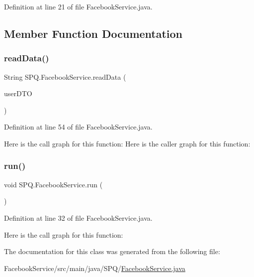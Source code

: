 Definition at line 21 of file Facebook\+Service.\+java.



\subsection{Member Function Documentation}
\mbox{\label{class_s_p_q_1_1_facebook_service_a087e3aab2d870149c0ef74f3adf75efa}} 
\subsubsection{\texorpdfstring{read\+Data()}{readData()}}
{\footnotesize\ttfamily String S\+P\+Q.\+Facebook\+Service.\+read\+Data (\begin{DoxyParamCaption}\item[{\mbox{\hyperlink{class_s_p_q_1_1dto_1_1_user_d_t_o}{User\+D\+TO}}}]{user\+D\+TO }\end{DoxyParamCaption})}



Definition at line 54 of file Facebook\+Service.\+java.

Here is the call graph for this function\+:
Here is the caller graph for this function\+:
\mbox{\label{class_s_p_q_1_1_facebook_service_a24a62bc6a32966419548314bc417abfb}} 
\subsubsection{\texorpdfstring{run()}{run()}}
{\footnotesize\ttfamily void S\+P\+Q.\+Facebook\+Service.\+run (\begin{DoxyParamCaption}{ }\end{DoxyParamCaption})}



Definition at line 32 of file Facebook\+Service.\+java.

Here is the call graph for this function\+:


The documentation for this class was generated from the following file\+:\begin{DoxyCompactItemize}
\item 
Facebook\+Service/src/main/java/\+S\+P\+Q/\mbox{\hyperlink{_facebook_service_8java}{Facebook\+Service.\+java}}\end{DoxyCompactItemize}
